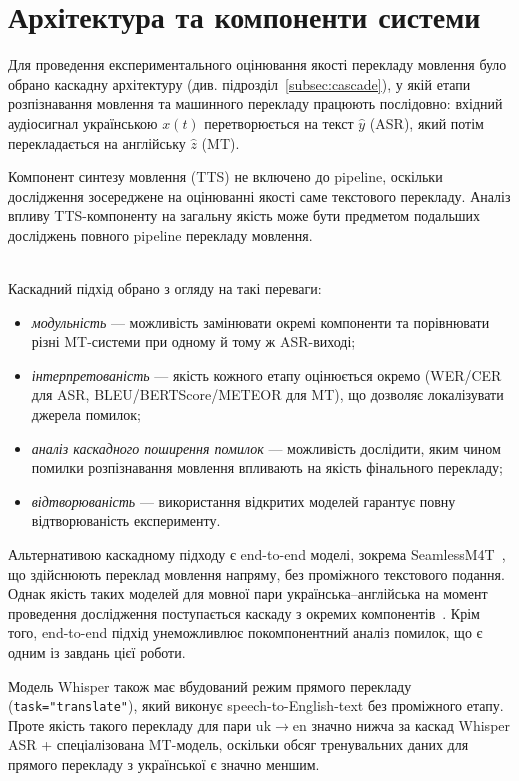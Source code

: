 \section{Архітектура та компоненти системи}

Для проведення експериментального оцінювання якості перекладу мовлення
було обрано каскадну архітектуру (див. підрозділ~\ref{subsec:cascade}), у якій етапи
розпізнавання мовлення та машинного перекладу працюють послідовно:
вхідний аудіосигнал українською $x(t)$ перетворюється на текст $\hat{y}$
(ASR), який потім перекладається на англійську $\hat{z}$ (MT).

Компонент синтезу мовлення (TTS) не включено до pipeline, оскільки
дослідження зосереджене на оцінюванні якості саме текстового перекладу.
Аналіз впливу TTS-компоненту на загальну якість може бути предметом
подальших досліджень повного pipeline перекладу мовлення.

\\
Каскадний підхід обрано з огляду на такі переваги:
\begin{itemize}[nosep]
    \item \textit{модульність} --- можливість замінювати окремі компоненти
    та порівнювати різні MT-системи при одному й тому ж ASR-виході;
    \item \textit{інтерпретованість} --- якість кожного етапу оцінюється
    окремо (WER/CER для ASR, BLEU/BERTScore/METEOR для MT), що дозволяє
    локалізувати джерела помилок;
    \item \textit{аналіз каскадного поширення помилок} --- можливість
    дослідити, яким чином помилки розпізнавання мовлення впливають на
    якість фінального перекладу;
    \item \textit{відтворюваність} --- використання відкритих моделей
    гарантує повну відтворюваність експерименту.
\end{itemize}

Альтернативою каскадному підходу є end-to-end моделі, зокрема
\newline SeamlessM4T~\cite{seamlessm4t}, що здійснюють переклад мовлення напряму,
без проміжного текстового подання. Однак якість таких моделей для мовної
пари українська--англійська на момент проведення дослідження поступається
каскаду з окремих компонентів~\cite{seamlessm4t}. Крім того, end-to-end
підхід унеможливлює покомпонентний аналіз помилок, що є одним із завдань
цієї роботи.

Модель Whisper також має вбудований режим прямого перекладу
\newline(\texttt{task="translate"}), який виконує speech-to-English-text без
проміжного етапу. Проте якість такого перекладу для пари uk$\to$en значно
нижча за каскад Whisper ASR + спеціалізована MT-модель, оскільки обсяг
тренувальних даних для прямого перекладу з української є значно меншим.

